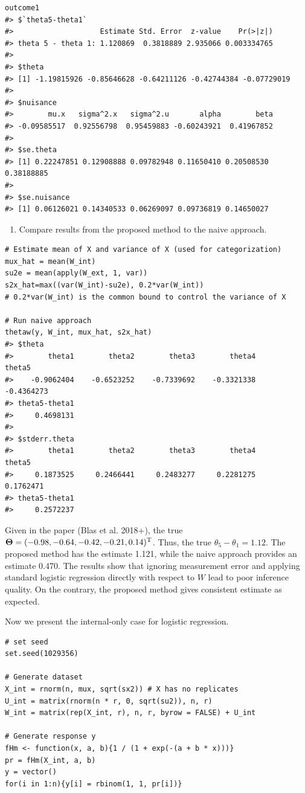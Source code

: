 \documentclass[15 pt,]{article}
\providecommand{\tightlist}{%
  \setlength{\itemsep}{0pt}\setlength{\parskip}{0pt}}
\begin{document}
\begin{verbatim}
outcome1
#> $`theta5-theta1`
#>                    Estimate Std. Error  z-value    Pr(>|z|)
#> theta 5 - theta 1: 1.120869  0.3818889 2.935066 0.003334765
#> 
#> $theta
#> [1] -1.19815926 -0.85646628 -0.64211126 -0.42744384 -0.07729019
#> 
#> $nuisance
#>        mu.x   sigma^2.x   sigma^2.u       alpha        beta 
#> -0.09585517  0.92556798  0.95459883 -0.60243921  0.41967852 
#> 
#> $se.theta
#> [1] 0.22247851 0.12908888 0.09782948 0.11650410 0.20508530 0.38188885
#> 
#> $se.nuisance
#> [1] 0.06126021 0.14340533 0.06269097 0.09736819 0.14650027
\end{verbatim}

\begin{enumerate}
\def\labelenumi{(\arabic{enumi})}
\setcounter{enumi}{4}
\tightlist
\item
  Compare results from the proposed method to the naive approach.
\end{enumerate}

\begin{verbatim}
# Estimate mean of X and variance of X (used for categorization)
mux_hat = mean(W_int)
su2e = mean(apply(W_ext, 1, var))
s2x_hat=max((var(W_int)-su2e), 0.2*var(W_int)) 
# 0.2*var(W_int) is the common bound to control the variance of X

# Run naive approach
thetaw(y, W_int, mux_hat, s2x_hat)
#> $theta
#>        theta1        theta2        theta3        theta4        theta5 
#>    -0.9062404    -0.6523252    -0.7339692    -0.3321338    -0.4364273 
#> theta5-theta1 
#>     0.4698131 
#> 
#> $stderr.theta
#>        theta1        theta2        theta3        theta4        theta5 
#>     0.1873525     0.2466441     0.2483277     0.2281275     0.1762471 
#> theta5-theta1 
#>     0.2572237
\end{verbatim}

Given in the paper (Blas et al. 2018+), the true
\(\mbox{\boldmath $\Theta$} = (-0.98, -0.64, -0.42, -0.21, 0.14)^{\rm T}\). Thus, the true
\(\theta_5 - \theta_1 = 1.12\). The proposed method has the estimate
1.121, while the naive approach provides an estimate 0.470. The results
show that ignoring measurement error and applying standard logistic
regression directly with respect to \(W\) lead to poor inference
quality. On the contrary, the proposed method gives consistent estimate
as expected.

Now we present the internal-only case for logistic regression.

\begin{verbatim}
# set seed
set.seed(1029356)

# Generate dataset
X_int = rnorm(n, mux, sqrt(sx2)) # X has no replicates
U_int = matrix(rnorm(n * r, 0, sqrt(su2)), n, r)
W_int = matrix(rep(X_int, r), n, r, byrow = FALSE) + U_int  
  
# Generate response y
fHm <- function(x, a, b){1 / (1 + exp(-(a + b * x)))}
pr = fHm(X_int, a, b)
y = vector()
for(i in 1:n){y[i] = rbinom(1, 1, pr[i])}
\end{verbatim}
\end{document}

